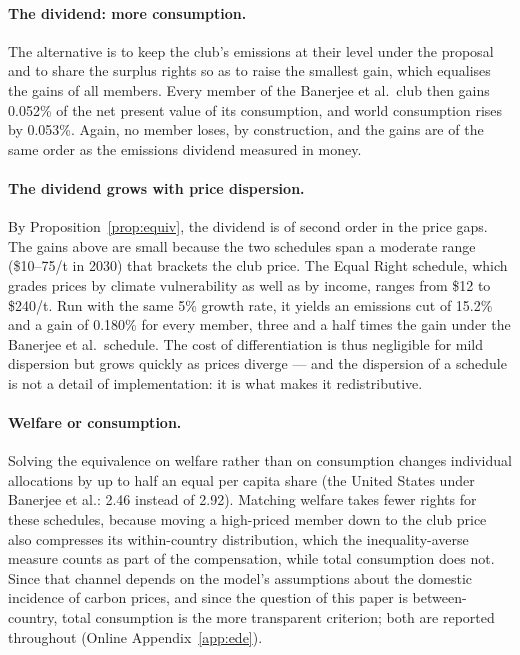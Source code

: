 \documentclass[12pt,english]{article}
\theoremstyle{remark}
\begin{document}
\paragraph{The dividend: more consumption.} The alternative is to keep the club's emissions at their level under the proposal and to share the surplus rights so as to raise the smallest gain, which equalises the gains of all members. Every member of the Banerjee et al.\ club then gains 0.052\% of the net present value of its consumption, and world consumption rises by 0.053\%. Again, no member loses, by construction, and the gains are of the same order as the emissions dividend measured in money.

\paragraph{The dividend grows with price dispersion.} By Proposition~\ref{prop:equiv}, the dividend is of second order in the price gaps. The gains above are small because the two schedules span a moderate range (\$10--75/t in 2030) that brackets the club price. The Equal Right schedule, which grades prices by climate vulnerability as well as by income, ranges from \$12 to \$240/t. Run with the same 5\% growth rate, it yields an emissions cut of 15.2\% and a gain of 0.180\% for every member, three and a half times the gain under the Banerjee et al.\ schedule. The cost of differentiation is thus negligible for mild dispersion but grows quickly as prices diverge --- and the dispersion of a schedule is not a detail of implementation: it is what makes it redistributive.

\paragraph{Welfare or consumption.} Solving the equivalence on welfare rather than on consumption changes individual allocations by up to half an equal per capita share (the United States under Banerjee et al.: 2.46 instead of 2.92). Matching welfare takes fewer rights for these schedules, because moving a high-priced member down to the club price also compresses its within-country distribution, which the inequality-averse measure counts as part of the compensation, while total consumption does not. Since that channel depends on the model's assumptions about the domestic incidence of carbon prices, and since the question of this paper is between-country, total consumption is the more transparent criterion; both are reported throughout (Online Appendix~\ref{app:ede}).
\end{document}
